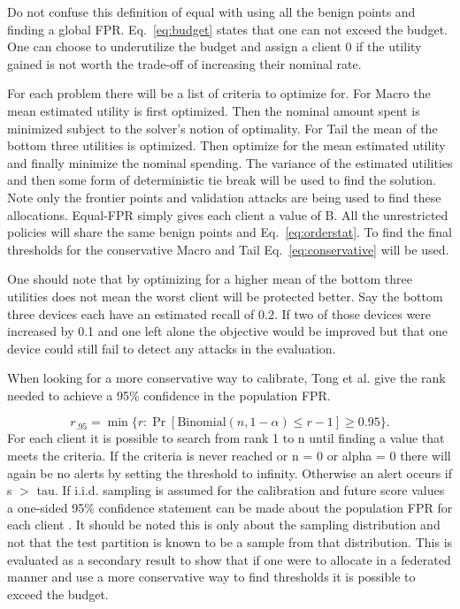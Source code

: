 \documentclass[pdflatex,sn-mathphys-num]{sn-jnl}
\begin{document}
Do not confuse this definition of equal with using all the benign points and finding a global FPR. Eq.~\ref{eq:budget} states that one can not exceed the budget. One can choose to underutilize the budget and assign a client 0 if the utility gained is not worth the trade-off of increasing their nominal rate.

For each problem there will be a list of criteria to optimize for. For Macro the mean estimated utility is first optimized. Then the nominal amount spent is minimized subject to the solver's notion of optimality. For Tail the mean of the bottom three utilities is optimized. Then optimize for the mean estimated utility and finally minimize the nominal spending. The variance of the estimated utilities and then some form of deterministic tie break will be used to find the solution. Note only the frontier points and validation attacks are being used to find these allocations. Equal-FPR simply gives each client a value of B. All the unrestricted policies will share the same benign points and Eq.~\ref{eq:orderstat}. To find the final thresholds for the conservative Macro and Tail Eq.~\ref{eq:conservative} will be used.

One should note that by optimizing for a higher mean of the bottom three utilities does not mean the worst client will be protected better. Say the bottom three devices each have an estimated recall of 0.2. If two of those devices were increased by 0.1 and one left alone the objective would be improved but that one device could still fail to detect any attacks in the evaluation.

When looking for a more conservative way to calibrate, Tong et al. \cite{tong2018np} give the rank needed to achieve a 95\% confidence in the population FPR.

\begin{equation}
 r_{.95}=\min\{r:\Pr[\mathrm{Binomial}(n,1-\alpha)\leq r-1]\geq0.95\}.
 \label{eq:conservative}
\end{equation}
For each client it is possible to search from rank 1 to n until finding a value that meets the criteria. If the criteria is never reached or n = 0 or alpha = 0 there will again be no alerts by setting the threshold to infinity. Otherwise an alert occurs if s $>$ tau. If i.i.d. sampling is assumed for the calibration and future score values a one-sided 95\% confidence statement can be made about the population FPR for each client \cite{tong2018np}. It should be noted this is only about the sampling distribution and not that the test partition is known to be a sample from that distribution. This is evaluated as a secondary result to show that if one were to allocate in a federated manner and use a more conservative way to find thresholds it is possible to exceed the budget.
\end{document}

